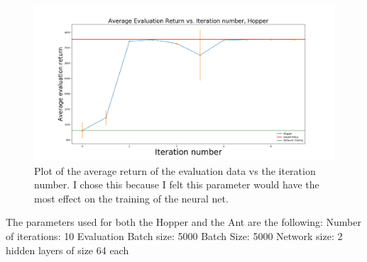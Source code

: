 \documentclass{article}
\begin{document}
\begin{figure}[H]
  \centering
  \includegraphics[width=1\linewidth]{irl_ass1_2.1_hopper.png}
  \caption{Plot of the average return of the evaluation data vs the iteration number. I chose this because I felt this parameter would have the most effect on the training of the neural net.}
  \label{fig:1.3}
\end{figure}

The parameters used for both the Hopper and the Ant are the following:
Number of iterations: 10
Evaluation Batch size: 5000
Batch Size: 5000
Network size: 2 hidden layers of size 64 each
\end{document}

